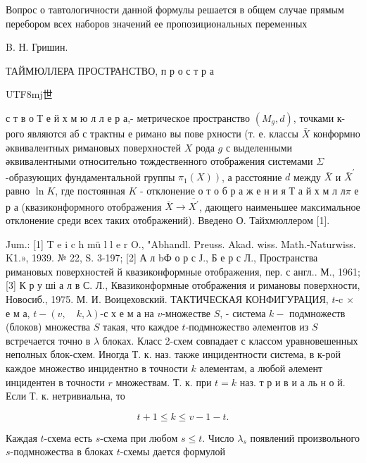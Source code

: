 \documentclass[10pt]{article}
\begin{document}
Вопрос о тавтологичности данной формулы решается в общем случае прямым перебором всех наборов значений ее пропозициональных переменных



B. Н. Гришин.



ТАЙМЮЛЛЕРА ПРОСТРАНСТВО, п р о с т р а \begin{CJK}{UTF8}{mj}世\end{CJK}с т в о Т е й х м ю л л е р а,- метрическое пространство $\left(M_{g}, d\right)$, точками к-рого являются аб с трактны е римано вы пове рхности (т. е. классы $\bar{X}$ конформно әквивалентных римановых поверхностей $X$ рода $g$ с выделенными әквивалентными относительно тождественного отображения системами $\Sigma$-образующих фундаментальной группы $\left.\pi_{1}(X)\right)$, а расстояние $d$ между $\bar{X}$ и $\bar{X}^{\prime}$ равно $\ln K$, где постоянная $K$ - отклонение о т о б р а ж е н и я Т а й х м л л$\pi$ е р а (квазиконформного отображения $\bar{X} \rightarrow \overline{X^{\prime}}$, дающего наименьшее максимальное отклонение среди всех таких отображений). Введено О. Тайхмюллером [1].



Jum.: [1] T e i c h mü l l e r O., "Abhandl. Preuss. Akad. wiss. Math.-Naturwiss. K1.», 1939. № 22, S. 3-197; [2] А л bФ о р с Ј., Б е р с Л., Пространства римановых поверхностей й квазиконформные отображения, пер. с англ.. М., 1961; [3] К р у ші а л в С. Л., Квазиконформные отображения и римановы поверхности, Новосиб., 1975. М. И. Воицеховский. ТАКТИЧЕСКАЯ КОНФИГУРАЦИЯ, $t$-c $\times$ е м а, $t-(v, \quad k, \lambda)$-с х е м а на $v$-множестве $S$, - система $k-$ подмножеств (блоков) множества $S$ такая, что каждое $t$-подмножество әлементов из $S$ встречается точно в $\lambda$ блоках. Класс 2-схем совпадает с классом уравновешенных неполных блок-схем. Иногда Т. к. наз. также инцидентности система, в к-рой каждое множество инцидентно в точности $k$ әлементам, а любой әлемент инцидентен в точности $r$ множествам. Т. к. при $t=k$ наз. т р и в и а ль н о й. Если Т. к. нетривиальна, то



\[

t+1 \leqslant k \leqslant v-1-t .

\]



Каждая $t$-схема есть $s$-схема при любом $s \leqslant t$. Число $\lambda_{s}$ появлений произвольного $s$-подмножества в блоках $t$-схемы дается формулой
\end{document}
